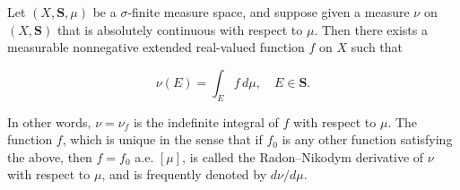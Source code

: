 Let $(X, \mathbf{S}, \mu)$ be a $\sigma$-finite measure space, and suppose given a measure $\nu$ on $(X, \mathbf{S})$ that is absolutely continuous with respect to $\mu$. Then there exists a measurable nonnegative extended real-valued function $f$ on $X$ such that

$$\nu(E) = \int_E f \, d\mu, \quad E \in \mathbf{S}.$$

In other words, $\nu = \nu_f$ is the indefinite integral of $f$ with respect to $\mu$. The function $f$, which is unique in the sense that if $f_0$ is any other function satisfying the above, then $f = f_0$ a.e. $[\mu]$, is called the Radon--Nikodym derivative of $\nu$ with respect to $\mu$, and is frequently denoted by $d\nu/d\mu$.
